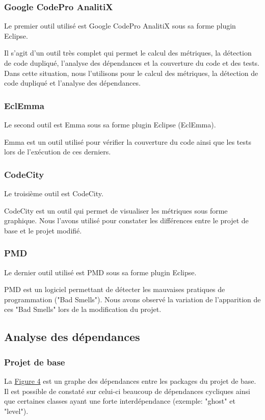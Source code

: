 \documentclass[a4paper,12pt]{report} %
\begin{document}
\subsubsection{Google CodePro AnalitiX}
Le premier outil utilisé est Google CodePro AnalitiX sous sa forme
plugin Eclipse.

Il s'agit d'un outil très complet qui permet le calcul des métriques,
la détection de code dupliqué, l'analyse des dépendances et la couverture
du code et des tests. Dans cette situation, nous l'utilisons pour le calcul des métriques,
la détection de code dupliqué et l'analyse des dépendances.

\subsubsection{EclEmma}
Le second outil est Emma sous sa forme plugin Eclipse (EclEmma).

Emma est un outil utilisé pour vérifier la couverture du code ainsi
que les tests lors de l'exécution de ces derniers.

\subsubsection{CodeCity}
Le troisième outil est CodeCity.

CodeCity est un outil qui permet de visualiser les métriques sous
forme graphique. Nous l'avons utilisé pour constater les différences
entre le projet de base et le projet modifié.

\subsubsection{PMD}
Le dernier outil utilisé est PMD sous sa forme plugin Eclipse.

PMD est un logiciel permettant de détecter les mauvaises pratiques
de programmation ("Bad Smells"). Nous avons observé la variation
de l'apparition de ces "Bad Smells" lors de la modification du
projet.

\subsection{Analyse des dépendances}
\subsubsection{Projet de base}

La \hyperref[figure4]{Figure 4} est un graphe des dépendances entre les packages
du projet de base. Il est possible de constaté sur celui-ci beaucoup de
dépendances cycliques ainsi que certaines classes ayant une forte interdépendance (exemple: "ghost" et "level").
\end{document}
